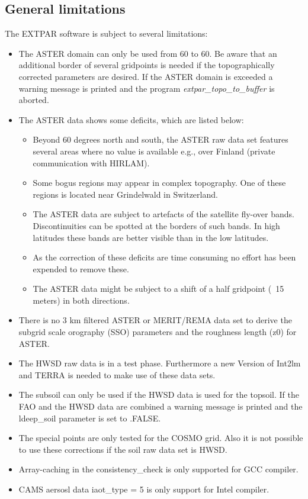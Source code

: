 \documentclass[a4paper,10pt,DIV14,BCOR1cm,titlepage,twoside]{scrartcl}
\begin{document}
\subsection{General limitations}
The EXTPAR software is subject to several limitations:
\begin{itemize}
 \item The ASTER domain can only be used from 60 to 60. Be aware that an additional border of several gridpoints is needed if the topographically corrected parameters are desired. If the ASTER domain is exceeded a warning message is printed and the program \textit{extpar\_topo\_to\_buffer} is aborted.
\item The ASTER data shows some deficits, which are listed below:
  \begin{itemize}
    \item Beyond 60 degrees north and south, the ASTER raw data set features several areas where no value is available e.g., over Finland (private communication with HIRLAM).
    \item Some bogus regions may appear in complex topography. One of these regions is located near Grindelwald in Switzerland.
    \item The ASTER data are subject to artefacts of the satellite fly-over bands. Discontinuities can be spotted at the borders of such bands. In high latitudes these bands are better visible than in the low latitudes.
    \item As the correction of these deficits are time consuming no effort has been expended to remove these.
    \item The ASTER data might be subject to a shift of a half gridpoint (~15 meters) in both directions.
  \end{itemize}
 \item There is no 3 km filtered ASTER or MERIT/REMA data set to derive the subgrid scale orography (SSO) parameters and the roughness length (z0) for ASTER. 
\item The HWSD raw data is in a test phase. Furthermore a new Version of Int2lm and TERRA is needed to make use of these data sets.
\item The subsoil can only be used if the HWSD data is used for the topsoil. If the FAO and the HWSD data are combined a warning message is printed and the ldeep\_soil parameter is set to .FALSE.
\item The special points are only tested for the COSMO grid. Also it is not possible to use these corrections if the soil raw data set is HWSD.
\item Array-caching in the consistency\_check is only supported for GCC compiler.
\item CAMS aersosl data iaot\_type = 5 is only support for Intel compiler.
\end{itemize}
\end{document}

